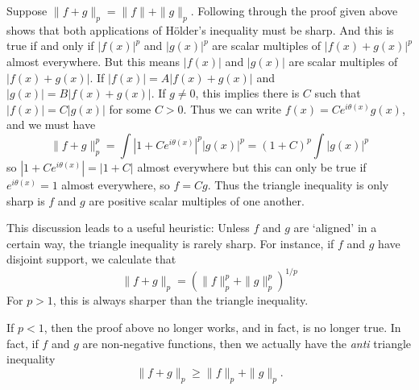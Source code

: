 \begin{remark}
  Suppose $\| f + g \|_p = \| f \| + \| g \|_p$. Following through the proof given above shows that both applications of H\"{o}lder's inequality must be sharp. And this is true if and only if $|f(x)|^p$ and $|g(x)|^p$ are scalar multiples of $|f(x) + g(x)|^p$ almost everywhere. But this means $|f(x)|$ and $|g(x)|$ are scalar multiples of $|f(x) + g(x)|$. If $|f(x)| = A|f(x) + g(x)|$ and $|g(x)| = B|f(x) + g(x)|$. If $g \neq 0$, this implies there is $C$ such that $|f(x)| = C |g(x)|$ for some $C > 0$. Thus we can write $f(x) = C e^{i \theta(x)} g(x)$, and we must have
  \[ \| f + g \|_p^p = \int |1 + C e^{i \theta(x)}|^p |g(x)|^p = (1 + C)^p \int |g(x)|^p \]
  so $|1 + Ce^{i \theta(x)}| = |1 + C|$ almost everywhere but this can only be true if $e^{i \theta(x)} = 1$ almost everywhere, so $f = C g$. Thus the triangle inequality is only sharp is $f$ and $g$ are positive scalar multiples of one another.
\end{remark}

This discussion leads to a useful heuristic: Unless $f$ and $g$ are `aligned' in a certain way, the triangle inequality is rarely sharp. For instance, if $f$ and $g$ have disjoint support, we calculate that
%
\[ \| f + g \|_p = \left( \| f \|_p^p + \| g \|_p^p \right)^{1/p} \]
%
For $p > 1$, this is always sharper than the triangle inequality.

\begin{remark}
  If $p < 1$, then the proof above no longer works, and in fact, is no longer true. In fact, if $f$ and $g$ are non-negative functions, then we actually have the \emph{anti} triangle inequality
  \[ \| f + g \|_p \geq \| f \|_p + \| g \|_p. \]
\end{remark}


